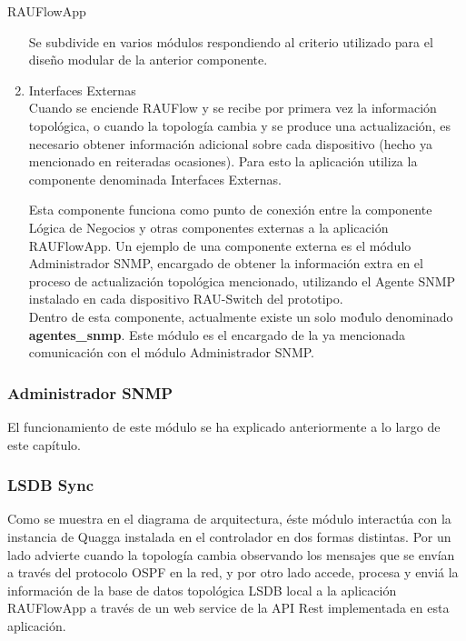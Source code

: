 \begin{subsubsection}{RAUFlowApp}
\begin{enumerate}
Se subdivide en varios m\'odulos respondiendo al criterio utilizado para el dise\~no modular de la anterior componente. 

\item Interfaces Externas\\
Cuando se enciende RAUFlow y se recibe por primera vez la informaci\'on topol\'ogica, o cuando la topolog\'ia cambia y se produce una actualizaci\'on, es necesario obtener informaci\'on adicional sobre cada dispositivo (hecho ya mencionado en reiteradas ocasiones). Para esto la aplicaci\'on utiliza la componente denominada Interfaces Externas. 

Esta componente funciona como punto de conexi\'on entre la componente L\'ogica de Negocios y otras componentes externas a la aplicaci\'on RAUFlowApp. Un ejemplo de una componente externa es el m\'odulo Administrador SNMP, encargado de obtener la informaci\'on extra en el proceso de actualizaci\'on topol\'ogica mencionado, utilizando el Agente SNMP instalado en cada dispositivo RAU-Switch del prototipo.\\

Dentro de esta componente, actualmente existe un solo mo\'dulo denominado \textbf{agentes\_snmp}. Este m\'odulo es el encargado de la ya mencionada comunicaci\'on con el m\'odulo Administrador SNMP. \\ 

\end{enumerate}

\end{subsubsection}

\subsubsection{Administrador SNMP}
El funcionamiento de este m\'odulo se ha explicado anteriormente a lo largo de este cap\'itulo.

\subsubsection{LSDB Sync}
Como se muestra en el diagrama de arquitectura, \'este m\'odulo interact\'ua con la instancia de Quagga instalada en el controlador en dos formas distintas. Por un lado advierte cuando la topolog\'ia cambia observando los mensajes que se env\'ian a través del protocolo OSPF en la red, y por otro lado accede, procesa y enviá la informaci\'on de la base de datos topol\'ogica LSDB local a la aplicaci\'on RAUFlowApp a trav\'es de un web service de la API Rest implementada en esta aplicaci\'on.
 
